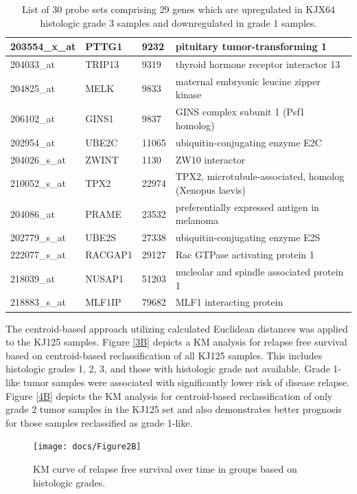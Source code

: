 \documentclass[a4paper,10pt]{article}
\begin{document}
\begin{table}
\begin{tabular}{| l | l | l | l | }
203554\_x\_at & PTTG1 & 9232 & pituitary tumor-transforming 1\\ \hline 
204033\_at & TRIP13 & 9319 & thyroid hormone receptor interactor 13\\ \hline 
204825\_at & MELK & 9833 & maternal embryonic leucine zipper kinase\\ \hline 
206102\_at & GINS1 & 9837 & GINS complex subunit 1 (Psf1 homolog)\\ \hline 
202954\_at & UBE2C & 11065 & ubiquitin-conjugating enzyme E2C\\ \hline 
204026\_s\_at & ZWINT & 1130 & ZW10 interactor\\ \hline 
210052\_s\_at & TPX2 & 22974 & TPX2, microtubule-associated, homolog (Xenopus laevis)\\ \hline 
204086\_at & PRAME & 23532 & preferentially expressed antigen in melanoma\\ \hline 
202779\_s\_at & UBE2S & 27338 & ubiquitin-conjugating enzyme E2S\\ \hline 
222077\_s\_at & RACGAP1 & 29127 & Rac GTPase activating protein 1\\ \hline 
218039\_at & NUSAP1 & 51203 & nucleolar and spindle associated protein 1\\ \hline 
218883\_s\_at & MLF1IP & 79682 & MLF1 interacting protein\\ \hline
\end{tabular}
\caption{List of 30 probe sets comprising 29 genes which are upregulated in KJX64 histologic 
grade 3 samples and downregulated in grade 1 samples.}\label{T1}
\end{table}


The centroid-based approach utilizing calculated Euclidean distances was applied to the 
KJ125 samples.   Figure \ref{3B} depicts a KM analysis for relapse free survival based on 
centroid-based reclassification of all KJ125 samples. This includes histologic grades 1, 2, 3, 
and those with histologic grade not available.  Grade 1-like tumor samples were associated 
with significantly lower risk of disease relapse.  Figure \ref{4B} depicts the KM analysis for 
centroid-based reclassification of only grade 2 tumor samples in the KJ125 set and 
also demonstrates better prognosis for those samples reclassified as grade 1-like. 
\begin{figure}
\vspace{10pt}
\centering
\texttt{[image: docs/Figure2B]}
\caption{ KM curve of relapse free survival over time in groups based on histologic grades.}\label{2B}
\end{figure}
\end{document}
